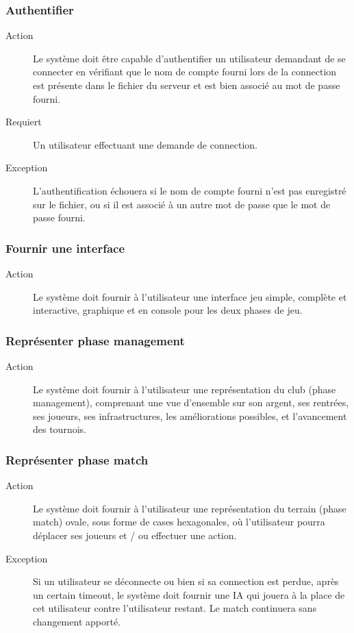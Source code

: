 \documentclass[a4paper]{article}
\begin{document}
\subsubsection{Authentifier}
\begin{description}
\item[Action] Le système doit être capable d'authentifier un \gls{utilisateur} demandant de se connecter en vérifiant que le nom de compte fourni lors de la connection est présente dans le fichier du \gls{serveur} et est bien associé au mot de passe fourni.
\item[Requiert] Un \gls{utilisateur} effectuant une demande de connection.
\item[Exception] L'authentification échouera si le nom de compte fourni n'est pas enregistré sur le fichier, ou si il est associé à un autre mot de passe que le mot de passe fourni.
\end{description}

\subsubsection{Fournir une interface}
\begin{description}
\item[Action] Le système doit fournir à l'\gls{utilisateur} une interface jeu simple, complète et interactive, graphique et en console pour les deux phases de jeu.
\end{description}

\subsubsection{Représenter phase management}
\begin{description}
\item[Action] Le système doit fournir à l'\gls{utilisateur} une représentation du \gls{club} (phase management), comprenant une vue d'ensemble sur son argent, ses rentrées, ses joueurs, ses infrastructures, les améliorations possibles, et l'avancement des tournois.
\end{description}

\subsubsection{Représenter phase match}
\begin{description}
\item[Action] Le système doit fournir à l'\gls{utilisateur} une représentation du terrain (phase match) ovale, sous forme de cases hexagonales, où l'\gls{utilisateur} pourra déplacer ses joueurs et / ou effectuer une action.
\item[Exception] Si un \gls{utilisateur} se déconnecte ou bien si sa connection est perdue, après un certain timeout, le système doit fournir une IA qui jouera à la place de cet \gls{utilisateur} contre l'\gls{utilisateur} restant. Le match continuera sans changement apporté.
\end{description}
\end{document}
